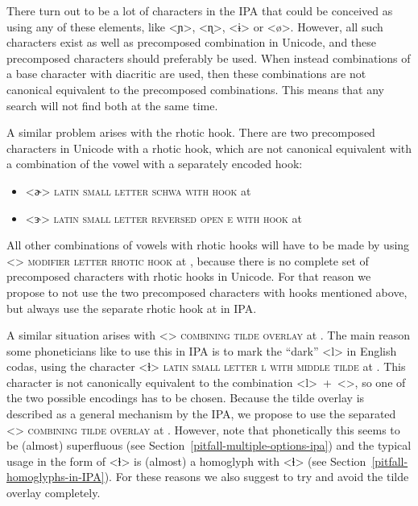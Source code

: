 There turn out to be a lot of characters in the IPA that could be conceived as
using any of these elements, like <ɲ>, <ɳ>, <ɨ> or <ø>. However, all such
characters exist as well as precomposed combination in Unicode, and these
precomposed characters should preferably be used. When instead combinations of a base character with
diacritic are used, then these combinations are not canonical equivalent to the
precomposed combinations. This means that any search will not find both at the
same time.


A similar problem arises with the rhotic hook. There are two precomposed
characters in Unicode with a rhotic hook, which are not canonical equivalent 
with a combination of the vowel with a separately encoded hook:
\begin{itemize}
  \item[] <ɚ> \textsc{latin small letter schwa with hook} at 
  \item[] <ɝ> \textsc{latin small letter reversed open e with hook} at 
\end{itemize}
All other combinations of vowels with rhotic hooks will have to be made by using
<> \textsc{modifier letter rhotic hook} at , because there
is no complete set of precomposed characters with rhotic hooks in Unicode. For
that reason we propose to not use the two precomposed characters with hooks
mentioned above, but always use the separate rhotic hook at  in IPA.\@

A similar situation arises with <> \textsc{combining tilde overlay} at
. The main reason some phoneticians like to use this in IPA is to mark
the ``dark'' <l> in English codas, using the character <ɫ> \textsc{latin small
letter l with middle tilde} at . This character is not canonically
equivalent to the combination <l>~+~<>, so one of the two possible
encodings has to be chosen. Because the tilde overlay is described as a general
mechanism by the IPA, we propose to use the separated <>
\textsc{combining tilde overlay} at . However, note that phonetically 
this seems to be (almost) superfluous (see Section~\ref{pitfall-multiple-options-ipa}) 
and the typical usage in the form of <ɫ> is (almost) a homoglyph with <ɬ> (see 
Section~\ref{pitfall-homoglyphs-in-IPA}). For these reasons we also suggest to try 
and avoid the tilde overlay completely.

